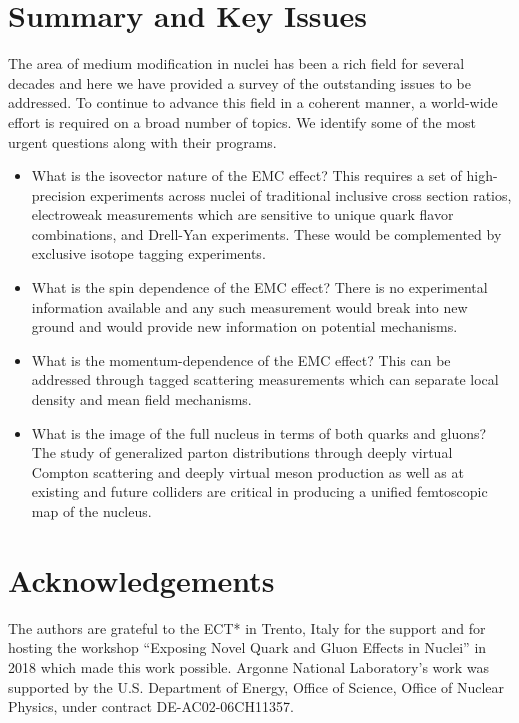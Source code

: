 \section{Summary and Key Issues}

The area of medium modification in nuclei has been a rich field for several decades and here we have provided a survey of the outstanding issues to be addressed.  To continue to advance this field in a coherent manner, a world-wide effort is required on a broad number of topics.  We identify some of the most urgent questions along with their programs.

\begin{itemize}
    \item{What is the isovector nature of the EMC effect?  This requires a set of high-precision experiments across nuclei of traditional inclusive cross section ratios, electroweak measurements which are sensitive to unique quark flavor combinations, and Drell-Yan experiments.  These would be complemented by exclusive isotope tagging experiments.}
    \item{What is the spin dependence of the EMC effect?  There is no experimental information available and any such measurement would break into new ground and would provide new information on potential mechanisms.}
    \item{What is the momentum-dependence of the EMC effect?  This can be addressed through tagged scattering measurements which can separate local density and mean field mechanisms.}
    \item{What is the image of the full nucleus in terms of both quarks and gluons?  The study of generalized parton distributions through deeply virtual Compton scattering and deeply virtual meson production as well as at existing and future colliders are critical in producing a unified femtoscopic map of the nucleus.}
\end{itemize}

\section{Acknowledgements}

The authors are grateful to the ECT* in Trento, Italy for the support and for hosting the workshop ``Exposing Novel Quark and Gluon Effects in Nuclei'' in 2018 which made this work possible.  Argonne National Laboratory's work was supported by the U.S. Department of Energy, Office of Science, Office of Nuclear Physics, under contract DE-AC02-06CH11357.  
